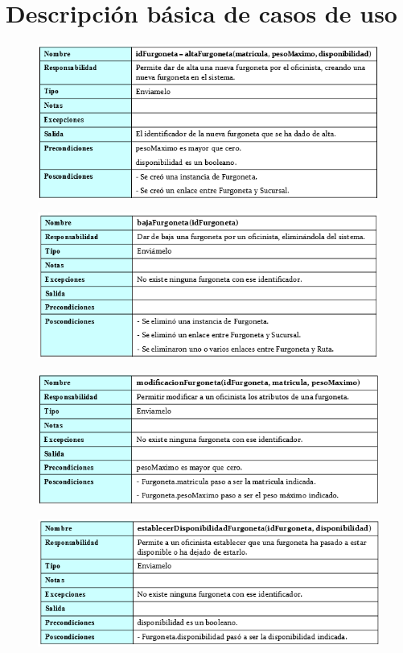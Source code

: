 \section{Descripción básica de casos de uso}
\begin{figure}[H]
	\centering
	\includegraphics[width=16cm]{1}
\end{figure}
\begin{figure}[H]
	\centering
	\includegraphics[width=16cm]{2}
\end{figure}
\begin{figure}[H]
	\centering
	\includegraphics[width=16cm]{3}
\end{figure}
\begin{figure}[H]
	\centering
	\includegraphics[width=16cm]{4}
\end{figure}
